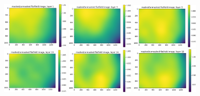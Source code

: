 \documentclass[letterpaper,11pt]{article}
\begin{document}
\begin{figure}[!ht]
\centering
\includegraphics[width=0.3\textwidth]{images/results/masked_over_unmasked_flatfield_image_layers/masked_over_unmasked_flatfield_image_layer_1}
\includegraphics[width=0.3\textwidth]{images/results/masked_over_unmasked_flatfield_image_layers/masked_over_unmasked_flatfield_image_layer_5}
\includegraphics[width=0.3\textwidth]{images/results/masked_over_unmasked_flatfield_image_layers/masked_over_unmasked_flatfield_image_layer_9}
\includegraphics[width=0.3\textwidth]{images/results/masked_over_unmasked_flatfield_image_layers/masked_over_unmasked_flatfield_image_layer_10}
\includegraphics[width=0.3\textwidth]{images/results/masked_over_unmasked_flatfield_image_layers/masked_over_unmasked_flatfield_image_layer_14}
\includegraphics[width=0.3\textwidth]{images/results/masked_over_unmasked_flatfield_image_layers/masked_over_unmasked_flatfield_image_layer_18}

\end{figure}
\end{document}
